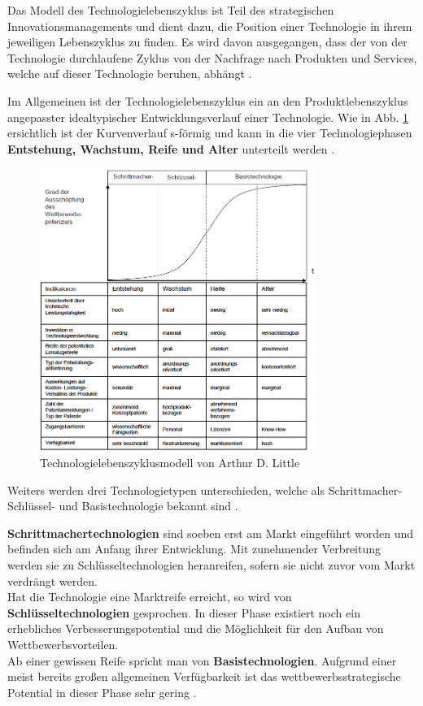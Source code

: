 Das Modell des Technologielebenszyklus ist Teil des strategischen Innovationsmanagements und dient dazu, die Position einer Technologie in ihrem jeweiligen Lebenszyklus zu finden. Es wird davon ausgegangen, dass der von der Technologie durchlaufene Zyklus von der Nachfrage nach Produkten und Services, welche auf dieser Technologie beruhen, abhängt \cite{Bru06} \cite{Schumann03}.

Im Allgemeinen ist der Technologielebenszyklus ein an den Produktlebenszyklus angepasster idealtypischer Entwicklungsverlauf einer Technologie. Wie in Abb. \ref{img:technologielebenszyklusmodell} ersichtlich ist der Kurvenverlauf s-förmig und kann in die vier Technologiephasen \textbf{Entstehung, Wachstum, Reife und Alter} unterteilt werden \cite{Schumann03}.

\begin{figure}[h!]
	\centering
	\includegraphics[width=0.8\textwidth]{BilderAllgemein/technologielebenszyklusmodell.PNG}
	\caption{Technologielebenszyklusmodell von Arthur D. Little \cite{Gerpott05}}
	\label{img:technologielebenszyklusmodell}
\end{figure}

Weiters werden drei Technologietypen unterschieden, welche als Schrittmacher- Schlüssel- und Basistechnologie bekannt sind \cite{Schumann03}.

\textbf{Schrittmachertechnologien} sind soeben erst am Markt eingeführt worden und befinden sich am Anfang ihrer Entwicklung. Mit zunehmender Verbreitung werden sie zu Schlüsseltechnologien heranreifen, sofern sie nicht zuvor vom Markt verdrängt werden. \\
Hat die Technologie eine Marktreife erreicht, so wird von \textbf{Schlüsseltechnologien} gesprochen. In dieser Phase existiert noch ein erhebliches Verbesserungspotential und die Möglichkeit für den Aufbau von Wettbewerbsvorteilen. \\
Ab einer gewissen Reife spricht man von \textbf{Basistechnologien}. Aufgrund einer meist bereits großen allgemeinen Verfügbarkeit ist das wettbewerbsstrategische Potential in dieser Phase sehr gering \cite{Bru06} \cite{Schumann03}.

